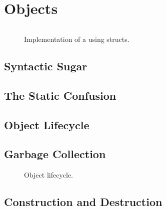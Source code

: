 \chapter{Objects}
\label{sec:objects}


\begin{figure}[tbp]
  \inputminted[fontsize=\footnotesize]{csharp}{../src/csharp/rectangle/Rectangle.cs}
  \caption{Implementation of a  using structs.}
  \label{fig:objects:rectangle:lib}
\end{figure}


\section{Syntactic Sugar}



\section{The Static Confusion}



\section{Object Lifecycle}

\section{Garbage Collection}

\begin{figure}[tbp]
  
  \caption{Object lifecycle.}
  \label{fig:objects:lifecycle}
\end{figure}

\section{Construction and Destruction}



